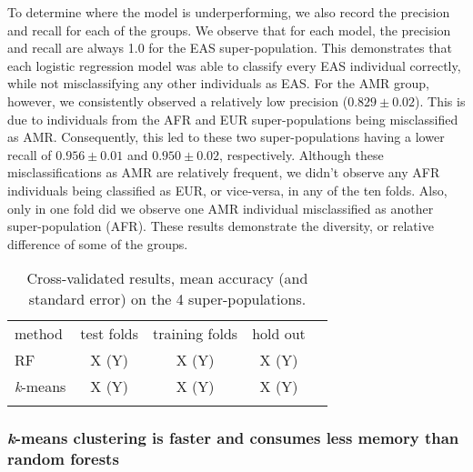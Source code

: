 \documentclass{llncs}
\newcommand{\kMeans}{\textit{k}-means}
\begin{document}
{To determine where the model is underperforming, we also record the precision and recall for each of the groups.
We observe that for each model, the precision and recall are always 1.0 for the EAS super-population.
This demonstrates that each logistic regression model was able to classify every EAS individual correctly, while not misclassifying any other individuals as EAS.
For the AMR group, however, we consistently observed a relatively low precision (\(0.829 \pm{} 0.02 \)).
This is due to individuals from the AFR and EUR super-populations being misclassified as AMR.
Consequently, this led to these two super-populations having a lower recall of \(0.956 \pm 0.01 \) and \(0.950 \pm 0.02 \), respectively.
Although these misclassifications as AMR are relatively frequent, we didn't observe any AFR individuals being classified as EUR, or vice-versa, in any of the ten folds.
Also, only in one fold did we observe one AMR individual misclassified as another super-population (AFR).
These results demonstrate the diversity, or relative difference of some of the groups. 

 

\begin{table}
\caption{Cross-validated results, mean accuracy (and standard error) on the 4 super-populations.}
\begin{center}
\renewcommand{\arraystretch}{1.4}
\setlength\tabcolsep{3pt}
\begin{tabular}{lcccc}
\hline\noalign{\smallskip}
method  & test folds & training folds & hold out \\
RF  & X (Y) & X (Y) & X (Y) \\
\kMeans & X (Y) & X (Y) & X (Y) \\
\noalign{\smallskip}
\hline
\end{tabular}
\end{center}
\end{table}







\subsubsection{\kMeans{} clustering is faster and consumes less memory than random forests}

}
\end{document}
